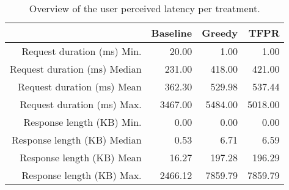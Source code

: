 \begin{table}[ht]
\centering
\begin{tabular}{rrrr}
  \hline
 & Baseline & Greedy & TFPR \\ 
  \hline
Request duration (ms) Min. & 20.00 & 1.00 & 1.00 \\ 
  Request duration (ms) Median & 231.00 & 418.00 & 421.00 \\ 
  Request duration (ms) Mean & 362.30 & 529.98 & 537.44 \\ 
  Request duration (ms) Max. & 3467.00 & 5484.00 & 5018.00 \\ 
  Response length (KB) Min. & 0.00 & 0.00 & 0.00 \\ 
  Response length (KB) Median & 0.53 & 6.71 & 6.59 \\ 
  Response length (KB) Mean & 16.27 & 197.28 & 196.29 \\ 
  Response length (KB) Max. & 2466.12 & 7859.79 & 7859.79 \\ 
   \hline
\end{tabular}
\caption{Overview of the user perceived latency per treatment.} 
\label{tab:results:rq2:summary:treatment}
\end{table}
